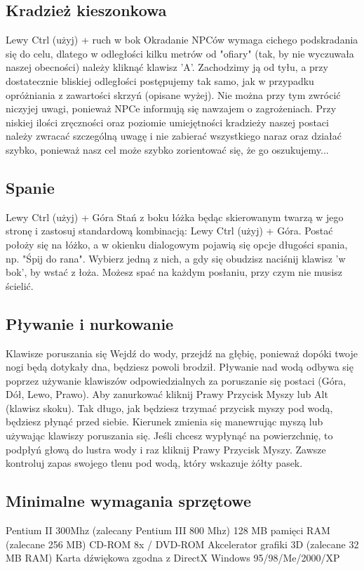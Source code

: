 \documentclass[11pt,polish, openany]{book}
\begin{document}
\subsection{Kradzież kieszonkowa}
Lewy Ctrl (użyj) + ruch w bok
Okradanie NPCów wymaga cichego podskradania się do celu, dlatego w odległości kilku metrów od "ofiary" (tak, by nie wyczuwała naszej obecności) należy kliknąć klawisz 'A'. Zachodzimy ją od tyłu, a przy dostatecznie bliskiej odległości postępujemy tak samo, jak w przypadku opróżniania z zawartości skrzyń (opisane wyżej). Nie można przy tym zwrócić niczyjej uwagi, ponieważ NPCe informują się nawzajem o zagrożeniach. Przy niskiej ilości zręczności oraz poziomie umiejętności kradzieży naszej postaci należy zwracać szczególną uwagę i nie zabierać wszystkiego naraz oraz działać szybko, ponieważ nasz cel może szybko zorientować się, że go oszukujemy...
\subsection{Spanie}
Lewy Ctrl (użyj) + Góra
Stań z boku łóżka będąc skierowanym twarzą w jego stronę i zastosuj standardową kombinacją: Lewy Ctrl (użyj) + Góra. Postać położy się na łóżko, a w okienku dialogowym pojawią się opcje długości spania, np. "Śpij do rana". Wybierz jedną z nich, a gdy się obudzisz naciśnij klawisz 'w bok', by wstać z łoża. Możesz spać na każdym posłaniu, przy czym nie musisz ścielić.
\subsection{Pływanie i nurkowanie}
Klawisze poruszania się
Wejdź do wody, przejdź na głębię, ponieważ dopóki twoje nogi będą dotykały dna, będziesz powoli brodził. Pływanie nad wodą odbywa się poprzez używanie klawiszów odpowiedzialnych za poruszanie się postaci (Góra, Dół, Lewo, Prawo).
Aby zanurkować kliknij Prawy Przycisk Myszy lub Alt (klawisz skoku). Tak długo, jak będziesz trzymać przycisk myszy pod wodą, będziesz płynąć przed siebie. Kierunek zmienia się manewrując myszą lub używając klawiszy poruszania się. Jeśli chcesz wypłynąć na powierzchnię, to podpłyń głową do lustra wody i raz kliknij Prawy Przycisk Myszy. Zawsze kontroluj zapas swojego tlenu pod wodą, który wskazuje żółty pasek.
\subsection{Minimalne wymagania sprzętowe}
Pentium II 300Mhz (zalecany Pentium III 800 Mhz)
128 MB pamięci RAM (zalecane 256 MB)
CD-ROM 8x / DVD-ROM
Akcelerator grafiki 3D (zalecane 32 MB RAM)
Karta dźwiękowa zgodna z DirectX
Windows 95/98/Me/2000/XP
\pagebreak
\end{document}
